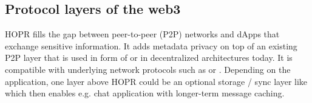 \subsection{Protocol layers of the web3}
HOPR fills the gap between peer-to-peer (P2P) networks and dApps that exchange sensitive information. It adds metadata privacy on top of an existing P2P layer that is used in form of  or  in decentralized architectures today. It is compatible with underlying network protocols such as  or . Depending on the application, one layer above HOPR could be an optional storage / sync layer like  which then enables e.g. chat application with longer-term message caching.

